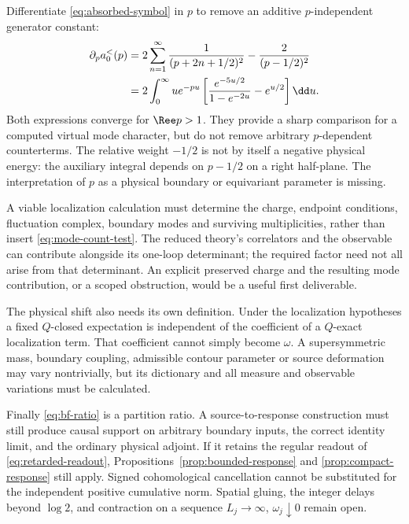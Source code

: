 Differentiate \eqref{eq:absorbed-symbol} in $p$ to remove
an additive $p$-independent generator constant:
\begin{align}\label{eq:mode-count-test}
 \partial_p a_0^{<}(p)
 &=2\sum_{n=1}^\infty\frac1{(p+2n+1/2)^2}
   -\frac2{(p-1/2)^2}\\
 &=2\int_0^\infty u e^{-pu}
 \left[\frac{e^{-5u/2}}{1-e^{-2u}}-e^{u/2}\right]\dd u.
 \notag
\end{align}
Both expressions converge for $\Ree p>1$. They provide a
sharp comparison for a computed virtual mode character,
but do not remove arbitrary $p$-dependent counterterms.
The relative weight $-1/2$ is not by itself a negative
physical energy: the auxiliary integral depends on
$p-1/2$ on a right half-plane. The interpretation of $p$
as a physical boundary or equivariant parameter is missing.

A viable localization calculation must determine the
charge, endpoint conditions, fluctuation complex, boundary
modes and surviving multiplicities, rather than insert
\eqref{eq:mode-count-test}. The reduced theory's correlators
and the observable can contribute alongside its one-loop
determinant; the required factor need not all arise from
that determinant. An explicit preserved charge and the
resulting mode contribution, or a scoped obstruction,
would be a useful first deliverable.

The physical shift also needs its own definition. Under
the localization hypotheses a fixed $Q$-closed expectation
is independent of the coefficient of a $Q$-exact
localization term. That coefficient cannot simply become
$\omega$. A supersymmetric mass, boundary coupling,
admissible contour parameter or source deformation may
vary nontrivially, but its dictionary and all measure and
observable variations must be calculated.

Finally \eqref{eq:bf-ratio} is a partition ratio. A
source-to-response construction must still produce causal
support on arbitrary boundary inputs, the correct identity
limit, and the ordinary physical adjoint. If it retains
the regular readout of \eqref{eq:retarded-readout},
Propositions~\ref{prop:bounded-response} and
\ref{prop:compact-response} still apply.
Signed cohomological cancellation cannot be substituted
for the independent positive cumulative norm. Spatial
gluing, the integer delays beyond $\log2$, and contraction
on a sequence $L_j\to\infty$, $\omega_j\downarrow0$
remain open.
